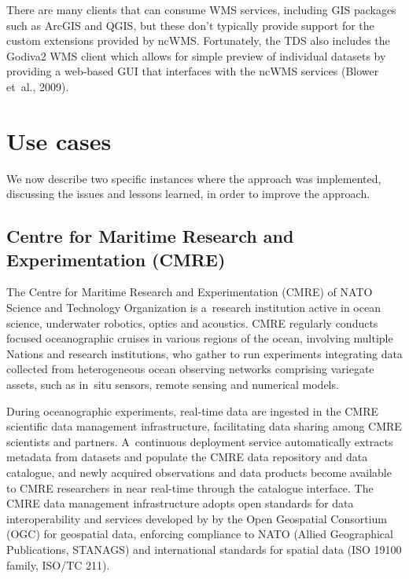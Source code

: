 \documentclass[osd, online, hvmath]{copernicus}
\begin{document}
There are many clients that can consume WMS services, including GIS packages such as ArcGIS and QGIS, but these don't typically provide support for the custom extensions provided by ncWMS.  Fortunately, the TDS also includes the Godiva2 WMS client which allows for simple preview of individual datasets by providing a web-based GUI that interfaces with the ncWMS services (Blower et~al., 2009).  

\section{Use cases}

We now describe two specific instances where the approach was
implemented,  discussing the issues and lessons learned, in order to improve the approach.

\subsection{Centre for Maritime Research and Experimentation (CMRE)}

The Centre for Maritime Research and Experimentation (CMRE) of NATO
Science and Technology Organization is a~research institution active
in ocean science, underwater robotics, optics and acoustics. 
CMRE regularly conducts focused oceanographic cruises in various regions of the ocean,
involving multiple Nations and research institutions, who gather to run
experiments integrating data collected from heterogeneous ocean
observing networks comprising variegate assets, such as in~situ sensors, remote sensing and numerical
models.

During oceanographic experiments, real-time data are ingested in the CMRE scientific
data management infrastructure, facilitating data sharing among CMRE scientists and partners.  
A~continuous deployment service automatically extracts metadata from datasets and populate the CMRE data repository and data catalogue, and newly acquired observations and data products become available to CMRE researchers in near real-time through the catalogue interface.
The CMRE data management infrastructure adopts open standards for data interoperability and services developed by by the Open
Geospatial Consortium (OGC) for geospatial data, enforcing compliance to NATO (Allied Geographical Publications, STANAGS) and international standards for spatial data (ISO 19100 family, ISO/TC 211). 
\end{document}
